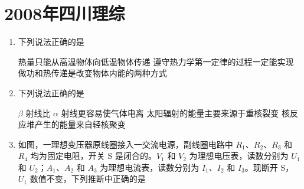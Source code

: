 \documentclass[\gkver]{gaokaozhenti}
\begin{document}
\chapter{2008年四川理综}

\begin{enumerate}
\item
下列说法正确的是

{热量只能从高温物体向低温物体传递}
{遵守热力学第一定律的过程一定能实现}
{做功和热传递是改变物体内能的两种方式}


\item
下列说法正确的是

{$\beta$ 射线比 $\alpha$ 射线更容易使气体电离}
{太阳辐射的能量主要来源于重核裂变}
{核反应堆产生的能量来自轻核聚变}


\item
如图，一理想变压器原线圈接入一交流电源，副线圈电路中 $R_{1}$、$R_{2}$、$R_{3}$ 和 $R_{4}$ 均为固定电阻，开关 S 是闭合的。$V_{1}$ 和 $V_{2}$ 为理想电压表，读数分别为 $U_{1}$ 和 $U_{2}$；$A_{1}$、$A_{2}$ 和 $A_{3}$ 为理想电流表，读数分别为 $I_{1}$、$I_{2}$ 和 $I_{3}$。现断开 S，$U_{1}$ 数值不变，下列推断中正确的是



\end{enumerate}
\end{document}
